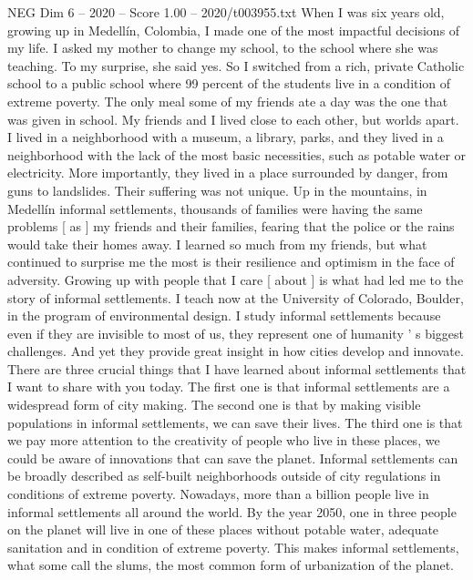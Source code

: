 \begin{textsample}{NEG Dim 6 – 2020 – Score 1.00 – 2020/t003955.txt}  \label{ex:f6_neg_025}
When I was six years old, growing up in Medellín, Colombia, I made one of the most impactful decisions of my life.
I asked my mother to change my school, to the school where she was teaching.
To my surprise, she said yes.
So I switched from a rich, private Catholic school to a public school where 99 percent of the students live in a condition of extreme poverty.
The only meal some of my friends ate a day was the one that was given in school.
My friends and I lived close to each other, but worlds apart.
I lived in a neighborhood with a museum, a library, parks, and they lived in a neighborhood with the lack of the most basic necessities, such as potable water or electricity.
More importantly, they lived in a place surrounded by danger, from guns to landslides.
Their suffering was not unique.
Up in the mountains, in Medellín informal settlements, thousands of families were having the same problems [ as ] my friends and their families, fearing that the police or the rains would take their homes away.
I learned so much from my friends, but what continued to surprise me the most is their resilience and optimism in the face of adversity.
Growing up with people that I care [ about ] is what had led me to the story of informal settlements.
I teach now at the University of Colorado, Boulder, in the program of environmental design.
I study informal settlements because even if they are invisible to most of us, they represent one of humanity ' s biggest challenges.
And yet they provide great insight in how cities develop and innovate.
There are three crucial things that I have learned about informal settlements that I want to share with you today.
The first one is that informal settlements are a widespread form of city making.
The second one is that by making visible populations in informal settlements, we can save their lives.
The third one is that we pay more attention to the creativity of people who live in these places, we could be aware of innovations that can save the planet.
Informal settlements can be broadly described as self-built neighborhoods outside of city regulations in conditions of extreme poverty.
Nowadays, more than a billion people live in informal settlements all around the world.
By the year 2050, one in three people on the planet will live in one of these places without potable water, adequate sanitation and in condition of extreme poverty.
This makes informal settlements, what some call the slums, the most common form of urbanization of the planet.

\end{textsample}

